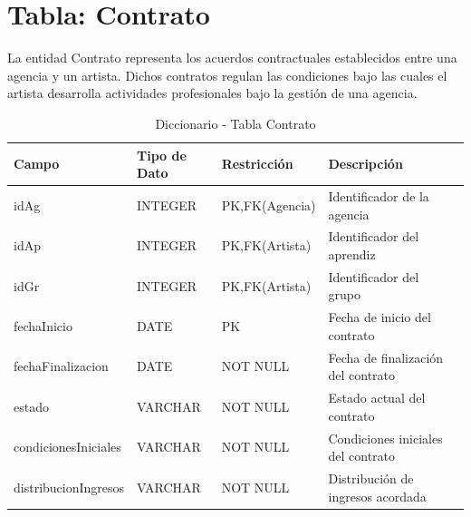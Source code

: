 \documentclass[12pt,a4paper,spanish,oneside]{report}
\begin{document}
\section{Tabla: Contrato}
La entidad Contrato representa los acuerdos contractuales establecidos entre una
agencia y un artista. Dichos contratos regulan las condiciones bajo las cuales el artista
desarrolla actividades profesionales bajo la gestión de una agencia.
\begin{table}[H]
\centering
\caption{Diccionario - Tabla Contrato}
\begin{tabular}{|l|l|l|l|l|}
\hline
\textbf{Campo} & \textbf{Tipo de Dato} & \textbf{Restricción} & \textbf{Descripción} \\
\hline
idAg & INTEGER & PK,FK(Agencia) & Identificador de la agencia \\
\hline
idAp & INTEGER & PK,FK(Artista) & Identificador del aprendiz \\
\hline
idGr & INTEGER & PK,FK(Artista) & Identificador del grupo  \\
\hline
fechaInicio & DATE & PK & Fecha de inicio del contrato \\
\hline
fechaFinalizacion & DATE & NOT NULL & Fecha de finalización del contrato \\
\hline
estado & VARCHAR & NOT NULL & Estado actual del contrato \\
\hline
condicionesIniciales & VARCHAR & NOT NULL & Condiciones iniciales del contrato \\
\hline
distribucionIngresos & VARCHAR & NOT NULL & Distribución de ingresos acordada \\
\hline
\end{tabular}
\end{table}
\end{document}
